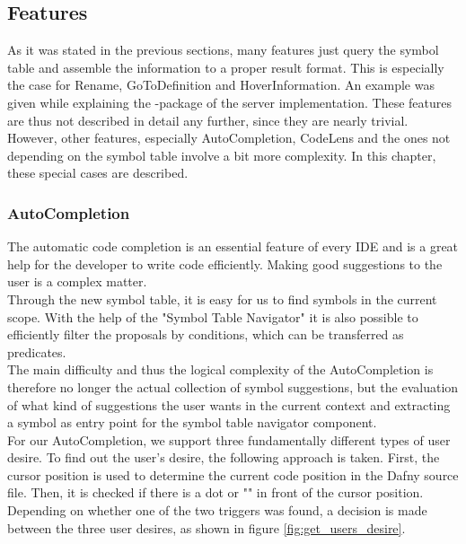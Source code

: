 \subsection{Features}
\label{section:imp:features}
As it was stated in the previous sections, many features just query the symbol table and assemble the information to a proper result format.
This is especially the case for Rename, GoToDefinition and HoverInformation.
An example was given while explaining the -package of the server implementation.
These features are thus not described in detail any further, since they are nearly trivial.
However, other features, especially AutoCompletion, CodeLens and the ones not depending on the symbol table involve a bit more complexity.
In this chapter, these special cases are described.

\subsubsection{AutoCompletion}
\label{section:implementation:core:completion}
The automatic code completion is an essential feature of every IDE and is a great help for the developer to write code efficiently.
Making good suggestions to the user is a complex matter. \\

Through the new symbol table, it is easy for us to find symbols in the current scope.
With the help of the "Symbol Table Navigator"
it is also possible to efficiently filter the proposals by conditions,
which can be transferred as predicates. \\

The main difficulty and thus the logical complexity of the AutoCompletion
is therefore no longer the actual collection of symbol suggestions,
but the evaluation of what kind of suggestions the user wants in the current context
and extracting a symbol as entry point for the symbol table navigator component. \\

For our AutoCompletion, we support three fundamentally different types of user desire.
To find out the user's desire, the following approach is taken.
First, the cursor position is used to determine the current code position in the Dafny source file.
Then, it is checked if there is a dot or "" in front of the cursor position.
Depending on whether one of the two triggers was found,
a decision is made between the three user desires, as shown in figure \ref{fig:get_users_desire}.

